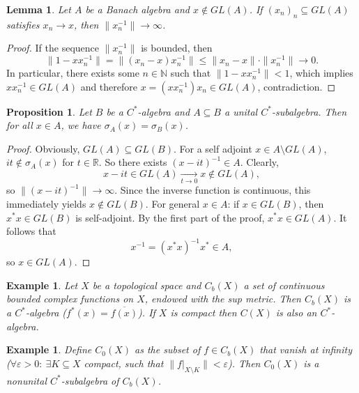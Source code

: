 \documentclass[10pt, a4paper]{article}
\newtheorem{proposition}[thm]{Proposition}
\newtheorem{example}[thm]{Example}
\newtheorem{lemma}[thm]{Lemma}
\newenvironment{noticeC}{%
  \tcolorbox[%
  notitle,
  empty,
  enhanced,  %
  breakable,
  coltext=black, 
  fontupper=\rmfamily,
  noparskip,
  sharp corners,
  boxrule=-1pt,  %
  frame hidden,
  left=7pt,  %
  right=7pt,
  top=5pt,
  bottom=5pt,
  before skip=2.5ex plus 2pt,
  after skip=2.5ex plus 2pt,
  overlay unbroken and last={%
  },
  ]}
{\endtcolorbox}
\newenvironment{myproof}%
  {\begin{noticeC}\begin{proof}}%
  {\end{proof}\end{noticeC}}
\newcommand{\N}{\mathbb {N}}
\newcommand{\R}{\mathbb {R}}
\begin{document}
\begin{lemma}
  Let $A$ be a Banach algebra and $x \notin GL(A)$.
  If $(x_n)_n \subseteq GL(A)$ satisfies $x_n \to x$, then $\|x_n ^{-1}\| \to \infty$.
\end{lemma}

\begin{myproof}
  If the sequence $\|x_n^{-1}\|$ is bounded, then 
  $$\| 1 - x x_n^{-1}\| = \| (x_n - x) x_n^{-1}\| \leq \| x_n - x\| \cdot \|x_n^{-1}\| \to 0.$$
  In particular, there exists some $n \in \N$ such that $\| 1 - xx_n^{-1}\| < 1$,
  which implies $x x_n^{-1} \in GL (A)$ and therefore $x = (x x_n^{-1}) x_n \in GL(A)$, contradiction.
\end{myproof}

\begin{proposition}
  Let $B$ be a $C^*$-algebra and $A \subseteq B$ a unital $C^*$-subalgebra.
  Then for all $x \in A$, we have $\sigma_A (x) = \sigma_B (x)$.
\end{proposition}

\begin{myproof}
  Obviously, $GL (A) \subseteq GL(B)$. For a self adjoint $x \in A \setminus GL(A)$,
  $it \notin \sigma_A (x)$ for $t \in \R$. So there exists $(x - it)^{-1} \in A$.
  Clearly, $$x - it \in GL(A) \xrightarrow[t \to 0]{} x \notin GL(A),$$
  so $\| (x - it)^{-1}\| \to \infty$. Since the inverse function is continuous,
  this immediately yields $x \notin GL (B)$.
  For general $x \in A$: if $x \in GL(B)$, then $x^* x \in GL(B)$ 
  is self-adjoint. By the first part of the proof, $x^* x \in GL(A)$.
  It follows that 
  \begin{equation*}
    x^{-1} = (x^* x)^{-1} x^* \in A,
  \end{equation*}
  so $x \in GL(A)$.
\end{myproof}

\begin{example}
  Let $X$ be a topological space and $C_b (X)$ a set of continuous bounded complex functions on $X$,
  endowed with the sup metric. Then $C_b (X)$ is a $C^*$-algebra ($f^*(x) = \overline{f(x)}$).
  If $X$ is compact then $C(X)$ is also an $C^*$-algebra.
\end{example}

\begin{example}
  Define $C_0 (X)$ as the subset of $f \in C_b (X)$
  that vanish at infinity ($\forall \varepsilon > 0:\ \exists K \subseteq X$ compact, such that $\|f\big|_{X \setminus K}\| < \varepsilon$).
  Then $C_0 (X)$ is a nonunital $C^*$-subalgebra of $C_b (X)$. 
\end{example}
\end{document}

